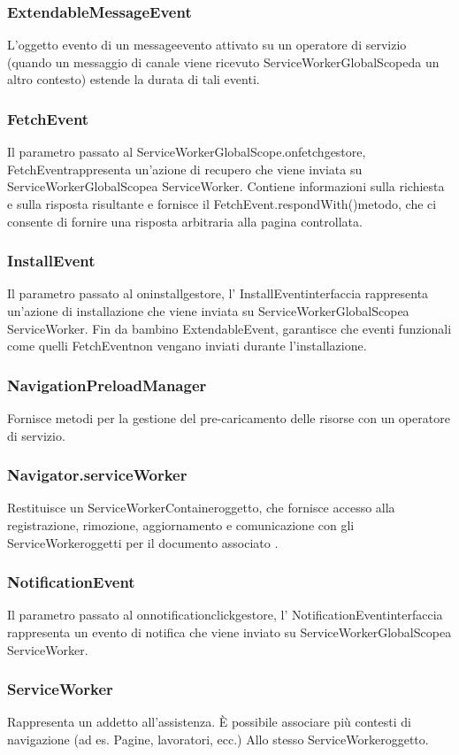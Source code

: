 \documentclass[italian]{article}
\begin{document}
\subsubsection{ExtendableMessageEvent}
L'oggetto evento di un messageevento attivato su un operatore di servizio (quando un messaggio di canale viene ricevuto ServiceWorkerGlobalScopeda un altro contesto) estende la durata di tali eventi.
\subsubsection{FetchEvent}
Il parametro passato al ServiceWorkerGlobalScope.onfetchgestore, FetchEventrappresenta un'azione di recupero che viene inviata su ServiceWorkerGlobalScopea ServiceWorker. Contiene informazioni sulla richiesta e sulla risposta risultante e fornisce il FetchEvent.respondWith()metodo, che ci consente di fornire una risposta arbitraria alla pagina controllata.
\subsubsection{InstallEvent}
Il parametro passato al oninstallgestore, l' InstallEventinterfaccia rappresenta un'azione di installazione che viene inviata su ServiceWorkerGlobalScopea ServiceWorker. Fin da bambino ExtendableEvent, garantisce che eventi funzionali come quelli FetchEventnon vengano inviati durante l'installazione.
\subsubsection{NavigationPreloadManager}
Fornisce metodi per la gestione del pre-caricamento delle risorse con un operatore di servizio.
\subsubsection{Navigator.serviceWorker}
Restituisce un ServiceWorkerContaineroggetto, che fornisce accesso alla registrazione, rimozione, aggiornamento e comunicazione con gli ServiceWorkeroggetti per il documento associato .
\subsubsection{NotificationEvent}
Il parametro passato al onnotificationclickgestore, l' NotificationEventinterfaccia rappresenta un evento di notifica che viene inviato su ServiceWorkerGlobalScopea ServiceWorker.
\subsubsection{ServiceWorker}
Rappresenta un addetto all'assistenza. È possibile associare più contesti di navigazione (ad es. Pagine, lavoratori, ecc.) Allo stesso ServiceWorkeroggetto.
\end{document}
